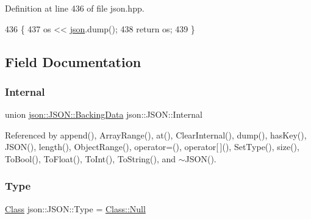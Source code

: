 Definition at line 436 of file json.\+hpp.


\begin{DoxyCode}
436                                                                   \{
437     os << \mbox{\hyperlink{namespacejson}{json}}.dump();
438     \textcolor{keywordflow}{return} os;
439 \}
\end{DoxyCode}


\subsection{Field Documentation}
\mbox{\label{classjson_1_1_j_s_o_n_a1e2a064794c3d55c8bb8887fc5734947}} 
\subsubsection{\texorpdfstring{Internal}{Internal}}
{\footnotesize\ttfamily union \mbox{\hyperlink{unionjson_1_1_j_s_o_n_1_1_backing_data}{json\+::\+J\+S\+O\+N\+::\+Backing\+Data}}  json\+::\+J\+S\+O\+N\+::\+Internal\hspace{0.3cm}{\ttfamily [private]}}



Referenced by append(), Array\+Range(), at(), Clear\+Internal(), dump(), has\+Key(), J\+S\+O\+N(), length(), Object\+Range(), operator=(), operator\mbox{[}$\,$\mbox{]}(), Set\+Type(), size(), To\+Bool(), To\+Float(), To\+Int(), To\+String(), and $\sim$\+J\+S\+O\+N().

\mbox{\label{classjson_1_1_j_s_o_n_a3fa6923afa41bdfe38077fbc0079aaf5}} 
\subsubsection{\texorpdfstring{Type}{Type}}
{\footnotesize\ttfamily \mbox{\hyperlink{classjson_1_1_j_s_o_n_a762f55df6d407c1af61607ed516ffe07}{Class}} json\+::\+J\+S\+O\+N\+::\+Type = \mbox{\hyperlink{classjson_1_1_j_s_o_n_a762f55df6d407c1af61607ed516ffe07abbb93ef26e3c101ff11cdd21cab08a94}{Class\+::\+Null}}\hspace{0.3cm}{\ttfamily [private]}}



